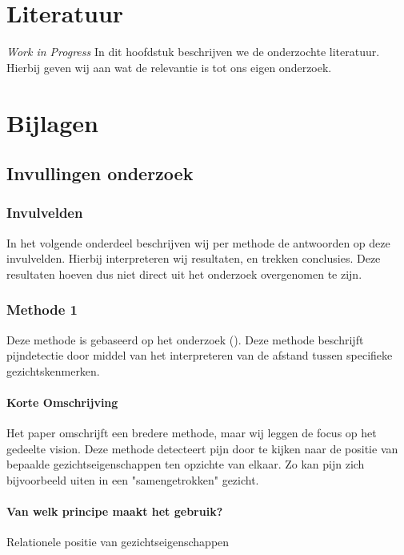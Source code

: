 \documentclass[11pt]{article}
\begin{document}
    \section{Literatuur}\label{sec:literatuur2}
    \emph{Work in Progress}
    In dit hoofdstuk beschrijven we de onderzochte literatuur.
    Hierbij geven wij aan wat de relevantie is tot ons eigen onderzoek.


    \section{Bijlagen}\label{sec:bijlagen}

    \subsection{Invullingen onderzoek}\label{subsec:invullingen-onderzoek}

    \subsubsection{Invulvelden}
    In het volgende onderdeel beschrijven wij per methode de antwoorden op deze invulvelden.
    Hierbij interpreteren wij resultaten, en trekken conclusies.
    Deze resultaten hoeven dus niet direct uit het onderzoek overgenomen te zijn.

    \subsubsection{Methode 1}
    Deze methode is gebaseerd op het onderzoek (\citet{werner2014automatic}).
    Deze methode beschrijft pijndetectie door middel van het interpreteren van de afstand tussen specifieke gezichtskenmerken.

    \paragraph{Korte Omschrijving}
    Het paper omschrijft een bredere methode, maar wij leggen de focus op het gedeelte vision.
    Deze methode detecteert pijn door te kijken naar de positie van bepaalde gezichtseigenschappen ten opzichte van elkaar.
    Zo kan pijn zich bijvoorbeeld uiten in een "samengetrokken" gezicht.

    \paragraph{Van welk principe maakt het gebruik?}
    Relationele positie van gezichtseigenschappen
\end{document}
